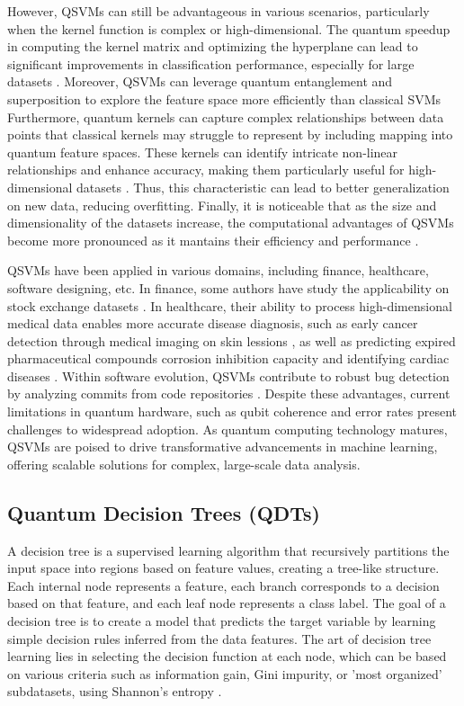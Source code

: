 \documentclass{article}
\begin{document}
However, QSVMs can still be advantageous in various scenarios, particularly when the kernel function is complex or high-dimensional. The quantum speedup in computing the kernel matrix and optimizing the hyperplane can lead to significant improvements in classification performance, especially for large datasets \cite{Akrom2024}. Moreover, QSVMs can leverage quantum entanglement and superposition to explore the feature space more efficiently than classical SVMs Furthermore, quantum kernels can capture complex relationships between data points that classical kernels may struggle to represent by including mapping into quantum feature spaces. These kernels can identify intricate non-linear relationships and enhance accuracy, making them particularly useful for high-dimensional datasets \cite{Srikumar2021}. Thus, this characteristic can lead to better generalization on new data, reducing overfitting. 
Finally, it is noticeable that as the size and dimensionality of the datasets increase, the computational advantages of QSVMs become more pronounced as it mantains their efficiency and performance \cite{Konar2022}. 

QSVMs have been applied in various domains, including finance, healthcare, software designing, etc. In finance, some authors have study the applicability on stock exchange datasets \cite{bhattacharjee2024classificationfinancialdatausing}. In healthcare, their ability to process high-dimensional medical data enables more accurate disease diagnosis, such as early cancer detection through medical imaging on skin lessions \cite{10613907}, as well as predicting expired pharmaceutical compounds corrosion inhibition capacity \cite{Rosyid2024} and identifying cardiac diseases \cite{Ozpolat2023}. Within software evolution, QSVMs contribute to robust bug detection by analyzing commits from code repositories \cite{Nadim_2025}. Despite these advantages, current limitations in quantum hardware, such as qubit coherence and error rates present challenges to widespread adoption. As quantum computing technology matures, QSVMs are poised to drive transformative advancements in machine learning, offering scalable solutions for complex, large-scale data analysis.

\subsection{Quantum Decision Trees (QDTs)}
A decision tree is a supervised learning algorithm that recursively partitions the input space into regions based on feature values, creating a tree-like structure. Each internal node represents a feature, each branch corresponds to a decision based on that feature, and each leaf node represents a class label. The goal of a decision tree is to create a model that predicts the target variable by learning simple decision rules inferred from the data features. The art of decision tree learning lies in selecting the decision function at each node, which can be based on various criteria such as information gain, Gini impurity, or 'most organized' subdatasets, using Shannon's entropy \cite{Ethem2020}.  
\end{document}
